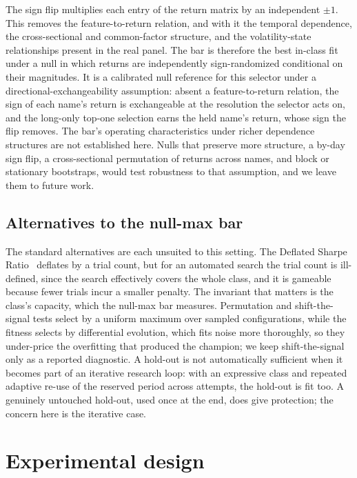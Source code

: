 \documentclass[11pt]{article}
\begin{document}
The sign flip multiplies each entry of the return matrix by an independent $\pm 1$. This removes the
feature-to-return relation, and with it the temporal dependence, the cross-sectional and common-factor
structure, and the volatility-state relationships present in the real panel. The bar is therefore the
best in-class fit under a null in which returns are independently sign-randomized conditional on their
magnitudes. It is a calibrated null reference for this selector under a directional-exchangeability
assumption: absent a feature-to-return relation, the sign of each name's return is exchangeable at the
resolution the selector acts on, and the long-only top-one selection earns the held name's return, whose
sign the flip removes. The bar's operating characteristics under richer dependence structures are not
established here. Nulls that preserve more structure, a by-day sign flip, a cross-sectional permutation of
returns across names, and block or stationary bootstraps, would test robustness to that assumption,
and we leave them to future work.

\subsection{Alternatives to the null-max bar}
\label{sec:whybar}

The standard alternatives are each unsuited to this setting. The Deflated Sharpe
Ratio~\cite{deflated} deflates by a trial count, but for an automated search the trial count is
ill-defined, since the search effectively covers the whole class, and it is gameable because fewer
trials incur a smaller penalty. The invariant that matters is the class's capacity, which the
null-max bar measures. Permutation and shift-the-signal tests select by a uniform maximum over
sampled configurations, while the fitness selects by differential evolution, which fits noise more
thoroughly, so they under-price the overfitting that produced the champion; we keep shift-the-signal only
as a reported diagnostic. A hold-out is not automatically sufficient when it becomes part of an
iterative research loop: with an expressive class and repeated adaptive re-use of the reserved period
across attempts, the hold-out is fit too. A genuinely untouched hold-out, used once at the end, does
give protection; the concern here is the iterative case.

\section{Experimental design}
\label{sec:design}
\end{document}
